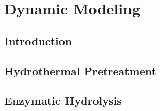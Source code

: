 \chapter{Dynamic Modeling}
\section{Introduction}
\lipsum
\section{Hydrothermal Pretreatment}
\lipsum
\section{Enzymatic Hydrolysis}
\lipsum